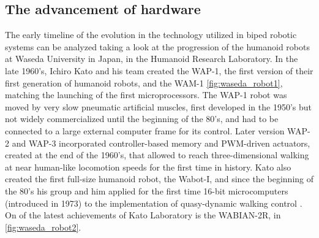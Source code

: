 \subsection{The advancement of hardware} %
\label{sub:the_advances_in_hardware}
The early timeline of the evolution in the technology utilized in biped robotic systems can be analyzed taking a look at the progression of the humanoid robots at Waseda University in Japan, in the Humanoid Research Laboratory.
In the late 1960's, Ichiro Kato and his team created the WAP-1, the first version of their first generation of humanoid robots, and the WAM-1 \ref{fig:waseda_robot1}, matching the launching of the first microprocessors.
The WAP-1 robot was moved by very slow pneumatic artificial muscles, first developed in the 1950's but not widely commercialized until the beginning of the 80's, and had to be connected to a large external computer frame for its control. 
Later version WAP-2 and WAP-3 incorporated controller-based memory and PWM-driven actuators, created at the end of the 1960's, that allowed to reach three-dimensional walking at near human-like locomotion speeds for the first time in history.
Kato also created the first full-size humanoid robot, the Wabot-I, and since the beginning of the 80's his group and him applied for the first time 16-bit microcomputers (introduced in 1973) to the implementation of quasy-dynamic walking control \cite{biped_robots_history}.
On of the latest achievements of Kato Laboratory is the WABIAN-2R, in \ref{fig:waseda_robot2}.

